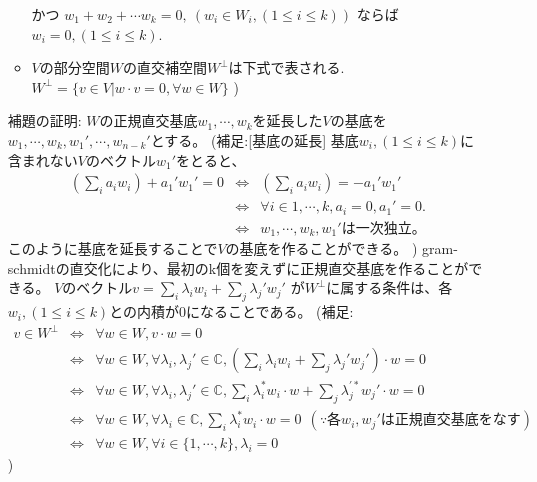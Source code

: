 \begin{itemize}
\begin{itemize}
\newline
かつ
\newline
$w_1 + w_2 + \cdots w_k = 0, ~( w_i \in W_i, (1 \leq i\leq k))$
ならば$w_i = 0, (1 \leq i\leq k)$.
\item
$V$の部分空間$W$の直交補空間$W^\perp$は下式で表される.
\newline
$W^\perp = \{v \in V | w \cdot v = 0, \forall w \in W\}$
)
\end{itemize}
\color{black}
補題の証明:
\newline
$W$の正規直交基底$w_1, \cdots, w_k$を延長した$V$の基底を
$w_1, \cdots, w_k, w_{1}', \cdots, w_{n-k}'$とする。
\newline
\color{blue}
(補足:[基底の延長]
\newline
基底$w_i, (1 \leq i \leq k)$に含まれない$V$のベクトル$w_1'$をとると、
\begin{eqnarray*}
(\sum_i a_i w_i) + a_1'w_1' = 0
 &\Leftrightarrow& (\sum_i a_i w_i) = - a_1'w_1'\\
&\Leftrightarrow& \forall i \in {1, \cdots, k}, a_i = 0, a_1' = 0.\\
&\Leftrightarrow& w_1, \cdots, w_k, w_1'
は一次独立。
\end{eqnarray*}
このように基底を延長することで$V$の基底を作ることができる。
)
\color{black}
\newline
gram-schmidtの直交化により、最初のk個を変えずに正規直交基底を作ることができる。
$V$のベクトル$v = \sum_i \lambda_i w_i + \sum_j \lambda_j' w_j'$
が$W^\perp$に属する条件は、各$w_i, (1 \leq i \leq k)$との内積が0になることである。
\newline
\color{blue}
(補足:
\begin{eqnarray*}
v \in W^\perp 
&\Leftrightarrow& \forall w \in W, v \cdot w = 0\\
&\Leftrightarrow& \forall w \in W, \forall \lambda_i, \lambda_j' \in \mathbb{C},
(\sum_i \lambda_i w_i + \sum_j \lambda_j' w_j') \cdot w = 0\\
&\Leftrightarrow& \forall w \in W, \forall \lambda_i, \lambda_j' \in \mathbb{C},
\sum_i \lambda_i^*  w_i \cdot w + \sum_j \lambda_j^{'*}  w_j' \cdot w = 0\\
&\Leftrightarrow& \forall w \in W, \forall \lambda_i \in \mathbb{C}, 
\sum_i \lambda_i^* w_i \cdot w = 0 ~~(\because 各w_i, w_j'は正規直交基底をなす)\\
&\Leftrightarrow& \forall w \in W, \forall i \in \{1, \cdots, k\},  \lambda_i = 0
\end{eqnarray*}
)
\newline
\color{black}

\end{itemize}
